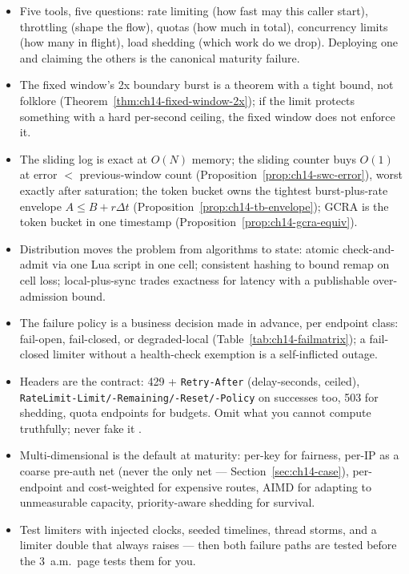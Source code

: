 \begin{itemize}
  \item Five tools, five questions: rate limiting (how fast may this caller
        start), throttling (shape the flow), quotas (how much in total),
        concurrency limits (how many in flight), load shedding (which work
        do we drop). Deploying one and claiming the others is the canonical
        maturity failure.
  \item The fixed window's 2x boundary burst is a theorem with a tight
        bound, not folklore (Theorem~\ref{thm:ch14-fixed-window-2x}); if
        the limit protects something with a hard per-second ceiling, the
        fixed window does not enforce it.
  \item The sliding log is exact at $O(N)$ memory; the sliding counter
        buys $O(1)$ at error $<$ previous-window count
        (Proposition~\ref{prop:ch14-swc-error}), worst exactly after
        saturation; the token bucket owns the tightest burst-plus-rate
        envelope $A \le B + r\Delta t$
        (Proposition~\ref{prop:ch14-tb-envelope}); GCRA is the token bucket
        in one timestamp (Proposition~\ref{prop:ch14-gcra-equiv}).
  \item Distribution moves the problem from algorithms to state: atomic
        check-and-admit via one Lua script in one cell; consistent hashing
        to bound remap on cell loss; local-plus-sync trades exactness for
        latency with a publishable over-admission bound.
  \item The failure policy is a business decision made in advance, per
        endpoint class: fail-open, fail-closed, or degraded-local
        (Table~\ref{tab:ch14-failmatrix}); a fail-closed limiter without a
        health-check exemption is a self-inflicted outage.
  \item Headers are the contract: 429 + \texttt{Retry-After}
        (delay-seconds, ceiled), \texttt{RateLimit-Limit/-Remaining/-Reset/-Policy}
        on successes too, 503 for shedding, quota endpoints for budgets.
        Omit what you cannot compute truthfully; never fake it
        \cite{ietf_ratelimit_headers,rfc9110}.
  \item Multi-dimensional is the default at maturity: per-key for fairness,
        per-IP as a coarse pre-auth net (never the only net ---
        Section~\ref{sec:ch14-case}), per-endpoint and cost-weighted for
        expensive routes, AIMD for adapting to unmeasurable capacity,
        priority-aware shedding for survival.
  \item Test limiters with injected clocks, seeded timelines, thread
        storms, and a limiter double that always raises --- then both
        failure paths are tested before the 3~a.m.\ page tests them for you.
\end{itemize}

